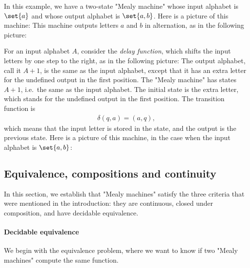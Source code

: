 \begin{myexample}\label{ex:alternating-a-b} In this example, we have a two-state "Mealy machine" whose input alphabet is $\set{a}$ and whose output alphabet is $\set{a,b}$. Here is a picture of this machine:
    This machine outputs letters $a$ and $b$ in alternation, as in the following picture:
\end{myexample}


\begin{myexample}[Delay]\label{ex:delay}
    For an input alphabet $A$, consider the \emph{delay function}, which shifts the input letters by one step to the right, as in the following picture: 
    The output alphabet, call it $A+1$,  is the same as the input alphabet, except that it has an extra letter for the undefined output in the first position. The "Mealy machine" has states $A+1$, i.e.~the same as the input alphabet. The initial state is the extra letter, which stands for the undefined output in the first position. The transition function  is 
    \begin{align*}
    \delta(q,a)  = (a,q),
    \end{align*}
which means that  the input letter is stored in the state, and the output is the previous state. Here is a picture of this machine, in the case when the input alphabet is $\set{a,b}$:
\end{myexample}

\subsection{Equivalence, compositions and continuity}
\label{sec:properties-mealy}
In this section, we establish that "Mealy machines" satisfy the three criteria that were mentioned in the introduction: they are continuous, closed under composition, and have decidable equivalence.

\paragraph*{Decidable equivalence} We begin with the equivalence problem, where we want to know if two "Mealy machines" compute the same function.


